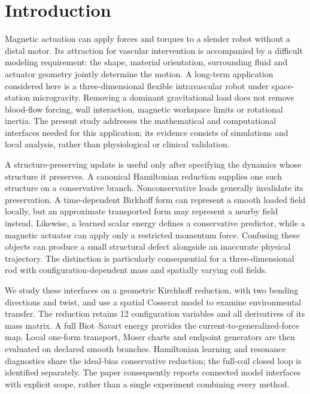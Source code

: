 \section{Introduction}
Magnetic actuation can apply forces and torques to a slender robot without a distal motor. Its attraction for vascular intervention is accompanied by a difficult modeling requirement: the shape, material orientation, surrounding fluid and actuator geometry jointly determine the motion. A long-term application considered here is a three-dimensional flexible intravascular robot under space-station microgravity. Removing a dominant gravitational load does not remove blood-flow forcing, wall interaction, magnetic workspace limits or rotational inertia. The present study addresses the mathematical and computational interfaces needed for this application; its evidence consists of simulations and local analysis, rather than physiological or clinical validation.

A structure-preserving update is useful only after specifying the dynamics whose structure it preserves. A canonical Hamiltonian reduction supplies one such structure on a conservative branch. Nonconservative loads generally invalidate its preservation. A time-dependent Birkhoff form can represent a smooth loaded field locally, but an approximate transported form may represent a nearby field instead. Likewise, a learned scalar energy defines a conservative predictor, while a magnetic actuator can apply only a restricted momentum force. Confusing these objects can produce a small structural defect alongside an inaccurate physical trajectory. The distinction is particularly consequential for a three-dimensional rod with configuration-dependent mass and spatially varying coil fields.

We study these interfaces on a geometric Kirchhoff reduction, with two bending directions and twist, and use a spatial Cosserat model to examine environmental transfer. The reduction retains 12 configuration variables and all derivatives of its mass matrix. A full Biot--Savart energy provides the current-to-generalized-force map. Local one-form transport, Moser charts and endpoint generators are then evaluated on declared smooth branches. Hamiltonian learning and resonance diagnostics share the ideal-bias conservative reduction; the full-coil closed loop is identified separately. The paper consequently reports connected model interfaces with explicit scope, rather than a single experiment combining every method.


